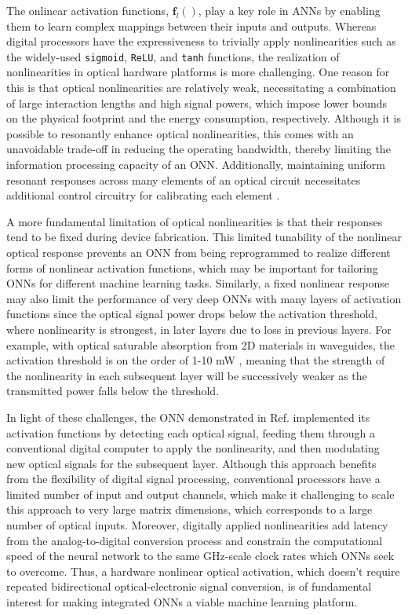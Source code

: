 The onlinear activation functions, $\mathbf{f}_l()$, play a key role in ANNs by enabling them to learn complex mappings between their inputs and outputs. 
Whereas digital processors have the expressiveness to trivially apply nonlinearities such as the widely-used \texttt{sigmoid}, \texttt{ReLU}, and \texttt{tanh} functions, the realization of nonlinearities in optical hardware platforms is more challenging. 
One reason for this is that optical nonlinearities are relatively weak, necessitating a combination of large interaction lengths and high signal powers, which impose lower bounds on the physical footprint and the energy consumption, respectively. 
Although it is possible to resonantly enhance optical nonlinearities, this comes with an unavoidable trade-off in reducing the operating bandwidth, thereby limiting the information processing capacity of an ONN. 
Additionally, maintaining uniform resonant responses across many elements of an optical circuit necessitates additional control circuitry for calibrating each element \cite{radulaski_thermally_2018}.

A more fundamental limitation of optical nonlinearities is that their responses tend to be fixed during device fabrication. 
This limited tunability of the nonlinear optical response prevents an ONN from being reprogrammed to realize different forms of nonlinear activation functions, which may be important for tailoring ONNs for different machine learning tasks. 
Similarly, a fixed nonlinear response may also limit the performance of very deep ONNs with many layers of activation functions since the optical signal power drops below the activation threshold, where nonlinearity is strongest, in later layers due to loss in previous layers. 
For example, with optical saturable absorption from 2D materials in waveguides, the activation threshold is on the order of 1-10 mW \cite{bao_monolayer_2011, park_monolayer_2015, jiang_low-dimensional_2018}, meaning that the strength of the nonlinearity in each subsequent layer will be successively weaker as the transmitted power falls below the threshold.

In light of these challenges, the ONN demonstrated in Ref.  implemented its activation functions by detecting each optical signal, feeding them through a conventional digital computer to apply the nonlinearity, and then modulating new optical signals for the subsequent layer. 
Although this approach benefits from the flexibility of digital signal processing, conventional processors have a limited number of input and output channels, which make it challenging to scale this approach to very large matrix dimensions, which corresponds to a large number of optical inputs. 
Moreover, digitally applied nonlinearities add latency from the analog-to-digital conversion process and constrain the computational speed of the neural network to the same GHz-scale clock rates which ONNs seek to overcome. 
Thus, a hardware nonlinear optical activation, which doesn't require repeated bidirectional optical-electronic signal conversion, is of fundamental interest for making integrated ONNs a viable machine learning platform.

